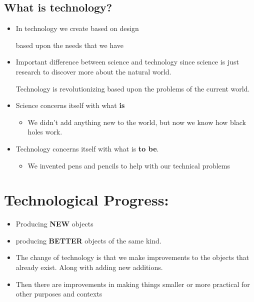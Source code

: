 \documentclass{article}
\begin{document}
\subsection{What is technology?}
\begin{itemize}
  \item In technology we create based on design

    based upon the needs that we have
  \item Important difference between science and technology
    since science is just research to discover more
    about the natural world.

    Technology is revolutionizing based upon the problems of the
    current world.
  \item Science concerns itself with what \textbf{is}
    \begin{itemize}
      \item We didn't add anything new to the world,
        but now we know how black holes work.
    \end{itemize}
  \item Technology concerns itself with what is \textbf{to be}.
    \begin{itemize}
      \item We invented pens and pencils to help
        with our technical problems
    \end{itemize}
\end{itemize}

\section*{Technological Progress:}
\begin{itemize}
  \item Producing \textbf{NEW} objects
  \item producing \textbf{BETTER} objects of the same kind.
  \item The change of technology is that we make
    improvements to the objects that already exist.
    Along with adding new additions.
  \item Then there are improvements in making things smaller
    or more practical for other purposes
    and contexts
\end{itemize}
\end{document}
